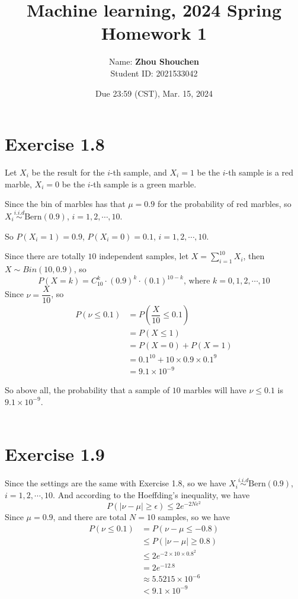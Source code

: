 \documentclass[10pt]{article}
\begin{document}
\title{	Machine learning, 2024 Spring\\Homework 1}
\date{Due 23:59 (CST), Mar. 15, 2024 }

\author{
    Name: \textbf{Zhou Shouchen} \\
	Student ID: 2021533042
}

\maketitle

\newpage

\section{Exercise 1.8}

Let $X_i$ be the result for the $i$-th sample, and $X_i=1$ be the $i$-th sample is a red marble, $X_i=0$ be the $i$-th sample is a green marble. 

Since the bin of marbles has that $\mu=0.9$ for the probability of red marbles, so 
$X_i\stackrel{i.i.d}{\sim} \text{Bern}(0.9)$, $i=1,2,\cdots,10$.

So $P(X_i=1)=0.9$, $P(X_i=0)=0.1$, $i=1,2,\cdots,10$.

Since there are totally $10$ independent samples, let $X=\sum\limits_{i=1}^{10}X_i$, then $X\sim Bin(10,0.9)$, so
$$P(X=k)=C_{10}^k\cdot (0.9)^k\cdot (0.1)^{10-k}\text{, where } k=0,1,2,\cdots,10$$
Since $\nu=\dfrac{X}{10}$, so
\begin{align*}
	P(\nu\leq 0.1) 
	&= P(\dfrac{X}{10}\leq 0.1) \\
	&= P(X\leq 1) \\
	&= P(X=0) + P(X=1)\\
	&= 0.1^{10}+10\times 0.9\times 0.1^9 \\
	&= 9.1\times 10^{-9}
\end{align*}

So above all, the probability that a sample of $10$ marbles will have $\nu\leq 0.1$ is $9.1\times 10^{-9}$.\\\\


\section{Exercise 1.9}
Since the settings are the same with Exercise 1.8, so we have $X_i\stackrel{i.i.d}{\sim} \text{Bern}(0.9)$, $i=1,2,\cdots,10$.
And according to the Hoeffding's inequality, we have
$$ P(|\nu-\mu|\geq \epsilon)\leq 2e^{-2N\epsilon^2}$$
Since $\mu=0.9$, and there are total $N=10$ samples, so we have
\begin{align*}
	P(\nu\leq 0.1) &= P(\nu-\mu\leq -0.8)\\
	&\leq P(|\nu-\mu|\geq 0.8)\\
	&\leq 2e^{-2\times 10\times 0.8^2}\\
	&= 2e^{-12.8}\\
	&\approx 5.5215\times 10^{-6}\\
	&< 9.1\times 10^{-9}
\end{align*}
\end{document}
